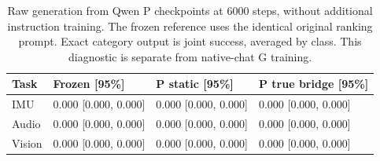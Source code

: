 \begin{table}[!htbp]\centering\small
\setlength{\tabcolsep}{4pt}
\caption{Raw generation from Qwen P checkpoints at 6000 steps, without additional instruction training. The frozen reference uses the identical original ranking prompt. Exact category output is joint success, averaged by class. This diagnostic is separate from native-chat G training.}\label{tab:raw-generation}
\begin{tabular}{@{}llll@{}}
\toprule
Task & Frozen [95\%] & P static [95\%] & P true bridge [95\%] \\
\midrule
IMU & 0.000 [0.000, 0.000] & 0.000 [0.000, 0.000] & 0.000 [0.000, 0.000] \\
Audio & 0.000 [0.000, 0.000] & 0.000 [0.000, 0.000] & 0.000 [0.000, 0.000] \\
Vision & 0.000 [0.000, 0.000] & 0.000 [0.000, 0.000] & 0.000 [0.000, 0.000] \\
\bottomrule
\end{tabular}
\end{table}\par

